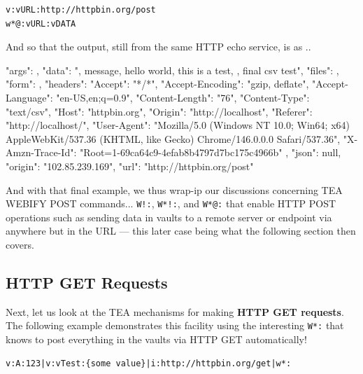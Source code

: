 \documentclass[a4paper, 18pt]{book} %
\begin{document}
{{{\begin{tcolorbox}[teaterminalstyle, title=W: EXAMPLE 8: A Simple HTTP POST - using non-Form-based POSTING, breakable]
\begin{lstlisting}[language=TEA,breaklines=true,]
v:vURL:http://httpbin.org/post
w*@:vURL:vDATA
   \end{lstlisting}
  \end{tcolorbox}

\vspace{1em}

And so that the output, still from the same HTTP echo service, is as ..


 \vspace{2em}
 \begin{tcbverbatim}[title=Sample OUTPUT 8 from EXAMPLE 8]
{
  "args": {}, 
  "data": "\nid, message, hello world, this is a test, , final csv test\n", 
  "files": {}, 
  "form": {}, 
  "headers": {
    "Accept": "*/*", 
    "Accept-Encoding": "gzip, deflate", 
    "Accept-Language": "en-US,en;q=0.9", 
    "Content-Length": "76", 
    "Content-Type": "text/csv", 
    "Host": "httpbin.org", 
    "Origin": "http://localhost", 
    "Referer": "http://localhost/", 
    "User-Agent": "Mozilla/5.0 (Windows NT 10.0; Win64; x64) AppleWebKit/537.36 (KHTML, like Gecko) Chrome/146.0.0.0 Safari/537.36", 
    "X-Amzn-Trace-Id": "Root=1-69ca64c9-4efab8b4797d7bc175c4966b"
  }, 
  "json": null, 
  "origin": "102.85.239.169", 
  "url": "http://httpbin.org/post"
}
  \end{tcbverbatim}
 \vspace{2em} 

  

And with that final example, we thus wrap-ip our discussions concerning TEA WEBIFY POST commands... \texttt{W!:}, \texttt{W*!:}, and \texttt{W*@:} that enable HTTP POST operations such as sending data in vaults to a remote server or endpoint via anywhere but in the URL --- this later case being what the following section then covers.


\subsection{HTTP GET Requests}

Next, let us look at the TEA mechanisms for making \textbf{HTTP GET requests}. The following example demonstrates this facility using the interesting \texttt{W*:} that knows to post everything in the vaults via HTTP GET automatically!


  \vspace{2em}

  \begin{tcolorbox}[teaterminalstyle, title=W: EXAMPLE 9: A Simple HTTP GET - real - with no explicit parameters, breakable]
  \begin{lstlisting}[language=TEA,breaklines=true,]
v:A:123|v:vTest:{some value}|i:http://httpbin.org/get|w*:
   \end{lstlisting}
  \end{tcolorbox}

}}}
\end{document}
